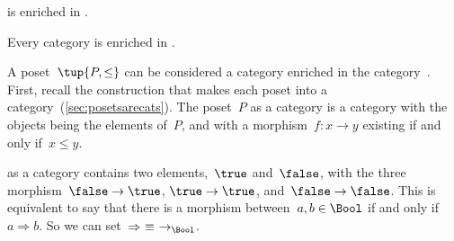{%
%

    \begin{example}
        \Category is enriched in \Category.
    \end{example}

    \begin{example}
        Every category is enriched in \Set.
    \end{example}


    \begin{example}
        A poset~$\tup{P, \leq}$ can be considered a category enriched in the category~\Bool.
        First, recall the construction that makes each poset into a category~(\cref{sec:posetsarecats}).
        The poset~$P$ as a category is a category with the objects being the elements of~$P$, and with a morphism~$f\colon x \to y$ existing if and only if~$x\leq y$.

        \Bool as a category contains two elements,~$\true$ and~$\false$, with
        the three morphism~$\false \to \true$, $\true \to \true$, and~$\false \to \false$.
        This is equivalent to say that there is a morphism between~$a, b \in \Bool$ if and only if~$a \Rightarrow b$.
        So we can set~$\Rightarrow\ \equiv\ \to_{\Bool}$.


\end{example}}
